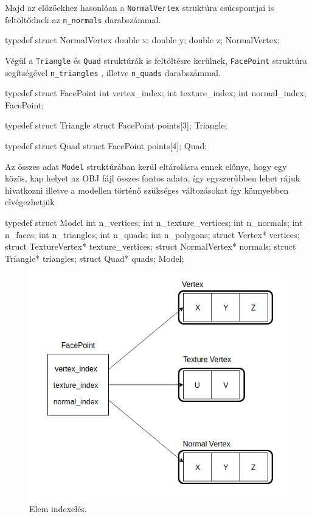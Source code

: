 Majd az előzőekhez hasonlóan a \texttt{NormalVertex}  struktúra csúcspontjai is feltöltődnek az \texttt{n\_normals} darabszámmal.
\bigskip
\begin{python}
typedef struct NormalVertex
{
    double x;
    double y;
    double z;
}NormalVertex;
\end{python}
\bigskip
\newpage
Végül a \texttt{Triangle} és \texttt{Quad} struktúrák is feltöltésre kerülnek, \texttt{FacePoint} struktúra segítségével \texttt{n\_triangles} , illetve \texttt{n\_quads} darabszámmal.
\bigskip
\begin{python}
typedef struct FacePoint
{
    int vertex_index;
    int texture_index;
    int normal_index;
} FacePoint;

typedef struct Triangle
{
    struct FacePoint points[3];
} Triangle;

typedef struct Quad
{
    struct FacePoint points[4];
} Quad;
\end{python}
\bigskip

Az összes adat  \texttt{Model} struktúrában kerül eltárolásra ennek előnye, hogy egy közös, kap helyet az OBJ fájl összes fontos adata, így egyszerűbben lehet rájuk hivatkozni illetve a modellen történő szükséges változásokat  így könnyebben elvégezhetjük
\bigskip
\begin{python}
typedef struct Model
{
    int n_vertices;
    int n_texture_vertices;
    int n_normals;
    int n_faces;
    int n_triangles;
    int n_quads;
    int n_polygons;
    struct Vertex* vertices;
    struct TextureVertex* texture_vertices;
    struct NormalVertex* normals;
    struct Triangle* triangles;
    struct Quad* quads;
}Model;
\end{python}
\newpage
{}

\bigskip
\begin{figure}[h]
\centering
\includegraphics[scale=0.5]{images/point.png}
\caption{Elem indexelés.}
\label{fig:index_}
\end{figure}
\bigskip

